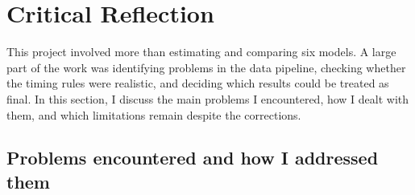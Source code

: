 \documentclass[11pt,a4paper]{article}
\begin{document}
\section{Critical Reflection}
\label{sec:critical-reflection}

This project involved more than estimating and comparing six models. A large
part of the work was identifying problems in the data pipeline, checking whether
the timing rules were realistic, and deciding which results could be treated as
final. In this section, I discuss the main problems I encountered, how I dealt
with them, and which limitations remain despite the corrections.

\subsection{Problems encountered and how I addressed them}
\end{document}
